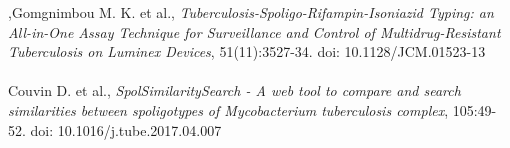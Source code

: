 \documentclass[twoside,a4paper,11pt,frenchb,openany]{report}
\begin{document}
\begin{spacing}{0.5}
\begin{thebibliography}{10}
,Gomgnimbou M. K. et al., \textit{Tuberculosis-Spoligo-Rifampin-Isoniazid Typing: an All-in-One Assay Technique for Surveillance and Control of Multidrug-Resistant Tuberculosis on Luminex Devices}, 51(11):3527-34. doi: 10.1128/JCM.01523-13\\ \\

Couvin D. et al., \textit{SpolSimilaritySearch - A web tool to compare and search similarities between spoligotypes of Mycobacterium tuberculosis complex}, 105:49-52. doi: 10.1016/j.tube.2017.04.007

\end{thebibliography}
\end{spacing}
\end{document}
